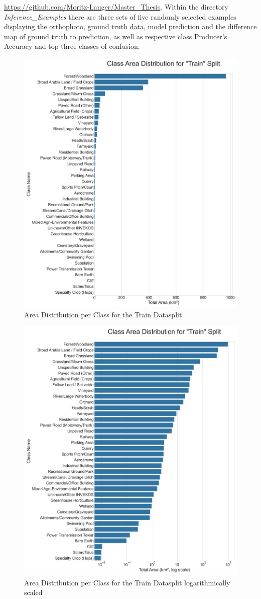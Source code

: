 \documentclass{report}
\begin{document}
\url{https://github.com/Moritz-Langer/Master_Thesis}. Within the directory \textit{Inference\_Examples} there are three sets of five randomly selected examples displaying the orthophoto, ground truth data, model prediction and the difference map of ground truth to prediction, as well as respective class Producer's Accuracy and top three classes of confusion.
\begin{figure} [H]
    \centering
    \includegraphics[width=0.65\linewidth]{own_images/area_distribution_abs_train.png}
    \caption{Area Distribution per Class for the Train Datasplit}
    \label{fig:train_data_distribution_abs}
\end{figure}

\begin{figure} [H]
    \centering
    \includegraphics[width=0.65\linewidth]{own_images/area_distribution_train.png}
    \caption{Area Distribution per Class for the Train Datasplit logarithmically scaled}
    \label{fig:train_data_distribution_log}
\end{figure}
\end{document}
